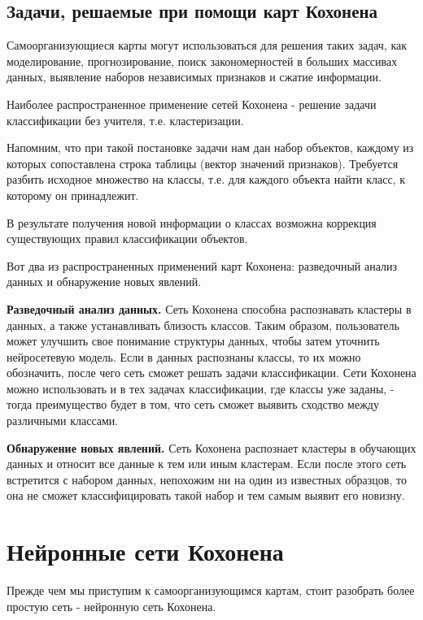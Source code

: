 \documentclass[a4paper,12pt]{article}
\begin{document}
\subsection{Задачи, решаемые при помощи карт Кохонена}

Самоорганизующиеся карты могут использоваться для решения таких задач, как моделирование, прогнозирование, поиск закономерностей в больших массивах данных, выявление наборов независимых признаков и сжатие информации.

Наиболее распространенное применение сетей Кохонена - решение задачи классификации без учителя, т.е. кластеризации.

Напомним, что при такой постановке задачи нам дан набор объектов, каждому из которых сопоставлена строка таблицы (вектор значений признаков). Требуется разбить исходное множество на классы, т.е. для каждого объекта найти класс, к которому он принадлежит.

В результате получения новой информации о классах возможна коррекция существующих правил классификации объектов.

Вот два из распространенных применений карт Кохонена: разведочный анализ данных и обнаружение новых явлений.

\textbf{Разведочный анализ данных.} Сеть Кохонена способна распознавать кластеры в данных, а также устанавливать близость классов. Таким образом, пользователь может улучшить свое понимание структуры данных, чтобы затем уточнить нейросетевую модель. Если в данных распознаны классы, то их можно обозначить, после чего сеть сможет решать задачи классификации. Сети Кохонена можно использовать и в тех задачах классификации, где классы уже заданы, - тогда преимущество будет в том, что сеть сможет выявить сходство между различными классами.

\textbf{Обнаружение новых явлений.} Сеть Кохонена распознает кластеры в обучающих данных и относит все данные к тем или иным кластерам. Если после этого сеть встретится с набором данных, непохожим ни на один из известных образцов, то она не сможет классифицировать такой набор и тем самым выявит его новизну.\cite{intuit}

\section{Нейронные сети Кохонена}

Прежде чем мы приступим к самоорганизующимся картам, стоит разобрать более простую сеть - нейронную сеть Кохонена.
\end{document}
